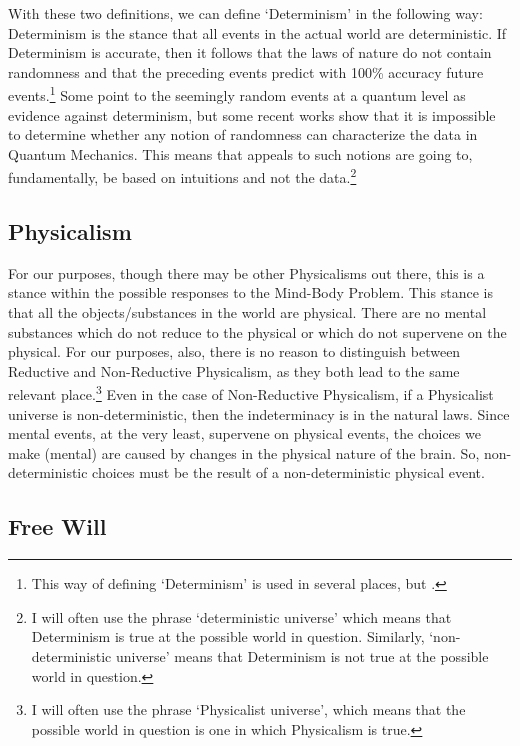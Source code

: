 With these two definitions, we can define ‘Determinism' in the following way: Determinism is the stance that all events in the actual world are deterministic. If Determinism is accurate, then it follows that the laws of nature do not contain randomness and that the preceding events predict with 100\% accuracy future events.\footnote{This way of defining ‘Determinism’ is used in several places, but \cite[most notably in][ ]{Popper1}.} Some point to the seemingly random events at a quantum level as evidence against determinism, but some recent works\autocite{Barrett1} show that it is impossible to determine whether any notion of randomness can characterize the data in Quantum Mechanics. This means that appeals to such notions are going to, fundamentally, be based on intuitions and not the data.\footnote{I will often use the phrase ‘deterministic universe’ which means that Determinism is true at the possible world in question. Similarly, ‘non-deterministic universe’ means that Determinism is not true at the possible world in question.}
\subsection{Physicalism}

For our purposes, though there may be other Physicalisms out there, this is a stance within the possible responses to the Mind-Body Problem. This stance is that all the objects/substances in the world are physical. There are no mental substances which do not reduce to the physical or which do not supervene on the physical. For our purposes, also, there is no reason to distinguish between Reductive and Non-Reductive Physicalism, as they both lead to the same relevant place.\footnote{I will often use the phrase ‘Physicalist universe’, which means that the possible world in question is one in which Physicalism is true.} Even in the case of Non-Reductive Physicalism, if a Physicalist universe is non-deterministic, then the indeterminacy is in the natural laws. Since mental events, at the very least, supervene on physical events, the choices we make (mental) are caused by changes in the physical nature of the brain. So, non-deterministic choices must be the result of a non-deterministic physical event.
\subsection{Free Will}

